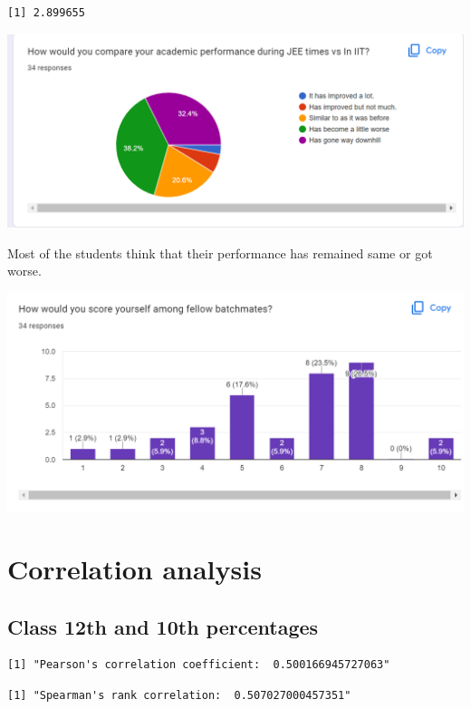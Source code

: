 \documentclass[
  letterpaper,
  DIV=11,
  numbers=noendperiod]{scrartcl}
\begin{document}
\begin{verbatim}
[1] 2.899655
\end{verbatim}

\includegraphics{Screenshot (388).png}

Most of the students think that their performance has remained same or
got worse.

\includegraphics{Screenshot (389).png}

\hypertarget{correlation-analysis}{%
\section{Correlation analysis}\label{correlation-analysis}}

\hypertarget{class-12th-and-10th-percentages}{%
\subsection{Class 12th and 10th
percentages}\label{class-12th-and-10th-percentages}}

\begin{verbatim}
[1] "Pearson's correlation coefficient:  0.500166945727063"
\end{verbatim}

\begin{verbatim}
[1] "Spearman's rank correlation:  0.507027000457351"
\end{verbatim}
\end{document}
